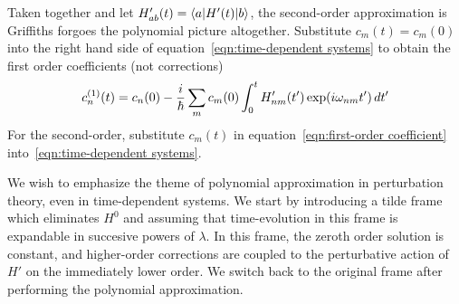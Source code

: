 Taken together and let $H'_{ab}(t) = \langle a|H'(t)|b\rangle$, the second-order approximation is 
Griffiths forgoes the polynomial picture altogether. 
Substitute $c_m(t)=c_m(0)$ into 
the right hand side of equation~\ref{eqn:time-dependent systems} to obtain 
the first order coefficients (not corrections)
\begin{equation}\label{eqn:first-order coefficient}
    c_n^{(1)}(t) = c_n(0) - \dfrac i {\hbar} \sum_m c_m(0)\int_0^t H'_{nm}(t')\exp(i\omega_{nm}t')\, dt'
\end{equation}
For the second-order, 
substitute $c_m(t)$ in equation~\ref{eqn:first-order coefficient} into~\ref{eqn:time-dependent systems}. 

We wish to emphasize the theme of polynomial approximation in perturbation theory, 
even in time-dependent systems. 
We start by introducing a tilde frame which eliminates $H^0$ and 
assuming that time-evolution in this frame is expandable in succesive powers of $\lambda$. 
In this frame, the zeroth order solution is constant, and higher-order corrections are coupled 
to the perturbative action of $H'$ on the immediately lower order. We switch back to the original 
frame after performing the polynomial approximation. 


